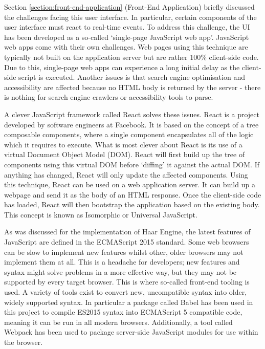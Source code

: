     Section \ref{section:front-end-application} (Front-End Application) briefly discussed the challenges facing this user interface. In particular, certain components of the user interface must react to real-time events. To address this challenge, the UI has been developed as a so-called `single-page JavaScript web app'. JavaScript web apps come with their own challenges. Web pages using this technique are typically not built on the application server but are rather 100\% client-side code. Due to this, single-page web apps can experience a long initial delay as the client-side script is executed. Another issues is that search engine optimisation and accessibility are affected because no HTML body is returned by the server - there is nothing for search engine crawlers or accessibility tools to parse.

    A clever JavaScript framework called React solves these issues. React is a project developed by software engineers at Facebook. It is based on the concept of a tree composable components, where a single component encapsulates all of the logic which it requires to execute. What is most clever about React is its use of a virtual Document Object Model (DOM). React will first build up the tree of components using this virtual DOM before `diffing' it against the actual DOM. If anything has changed, React will only update the affected components. Using this technique, React can be used on a web application server. It can build up a webpage and send it as the body of an HTML response. Once the client-side code has loaded, React will then bootstrap the application based on the existing body. This concept is known as Isomorphic or Universal JavaScript.

    As was discussed for the implementation of Haar Engine, the latest features of JavaScript are defined in the ECMAScript 2015 standard. Some web browsers can be slow to implement new features whilst other, older browsers may not implement them at all. This is a headache for developers; new features and syntax might solve problems in a more effective way, but they may not be supported by every target browser. This is where so-called front-end tooling is used. A variety of tools exist to convert new, uncompatible syntax into older, widely supported syntax. In particular a package called Babel has been used in this project to compile ES2015 syntax into ECMAScript 5 compatible code, meaning it can be run in all modern browsers. Additionally, a tool called Webpack has been used to package server-side JavaScript modules for use within the browser.

